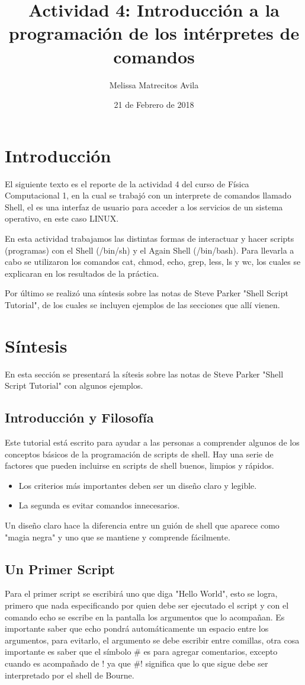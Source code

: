 \documentclass{article}
\title{Actividad 4: Introducción a la programación de los intérpretes de comandos}
\author{Melissa Matrecitos Avila}
\date{21 de Febrero de 2018}
\begin{document}
\maketitle

\section{Introducción}
El siguiente texto es el reporte de la actividad 4 del curso de Física Computacional 1, en la cual se trabajó con un interprete de comandos llamado Shell, el es una interfaz de usuario para acceder a los servicios de un sistema operativo, en este caso LINUX.

En esta actividad trabajamos las distintas formas de interactuar y hacer scripts (programas) con el Shell (/bin/sh) y el  Again Shell (/bin/bash). Para llevarla a cabo se utilizaron los comandos cat, chmod, echo, grep, less, ls y wc, los cuales se explicaran en los resultados de la práctica.

Por último se realizó una síntesis sobre las notas de Steve Parker "Shell Script Tutorial", de los cuales se incluyen ejemplos de las secciones que allí vienen.

\section{Síntesis}
En esta sección se presentará la sítesis sobre las notas de Steve Parker "Shell Script Tutorial" con algunos ejemplos.
\subsection{Introducción y Filosofía}
Este tutorial está escrito para ayudar a las personas a comprender algunos de los conceptos básicos de la programación de scripts de shell.
Hay una serie de factores que pueden incluirse en scripts de shell buenos, limpios y rápidos.
\begin{itemize}
\item Los criterios más importantes deben ser un diseño claro y legible.
\item La segunda es evitar comandos innecesarios.
\end{itemize}
Un diseño claro hace la diferencia entre un guión de shell que aparece como "magia negra" y uno que se mantiene y comprende fácilmente.
\subsection{Un Primer Script}
Para el primer script se escribirá uno que diga "Hello World", esto se logra, primero que nada especificando por quien debe ser ejecutado el script y con el comando echo se escribe en la pantalla los argumentos que lo acompañan. Es importante saber que echo pondrá automáticamente un espacio entre los argumentos, para evitarlo, el argumento se debe escribir entre comillas, otra cosa importante es saber que el símbolo  \# es para agregar comentarios, excepto cuando es acompañado de ! ya que \#! significa que lo que sigue debe ser interpretado por el shell de Bourne.
\end{document}
